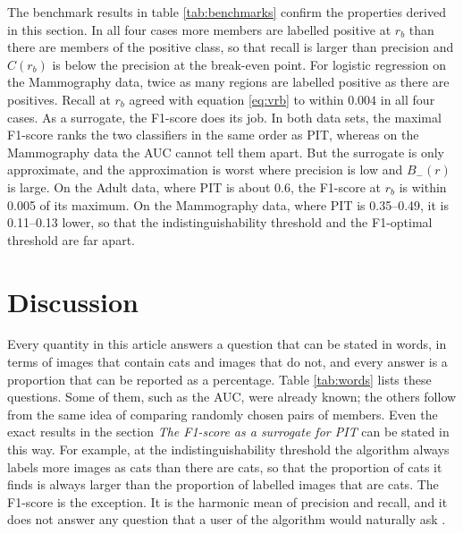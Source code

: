 \documentclass[preprint,12pt]{article}
\begin{document}
The benchmark results in table \ref{tab:benchmarks} confirm the properties derived in this section. In all four cases more members are labelled positive at $r_b$ than there are members of the positive class, so that recall is larger than precision and $C(r_b)$ is below the precision at the break-even point. For logistic regression on the Mammography data, twice as many regions are labelled positive as there are positives. Recall at $r_b$ agreed with equation \ref{eq:vrb} to within $0.004$ in all four cases. As a surrogate, the F1-score does its job. In both data sets, the maximal F1-score ranks the two classifiers in the same order as PIT, whereas on the Mammography data the AUC cannot tell them apart. But the surrogate is only approximate, and the approximation is worst where precision is low and $B_-(r)$ is large. On the Adult data, where PIT is about 0.6, the F1-score at $r_b$ is within 0.005 of its maximum. On the Mammography data, where PIT is 0.35--0.49, it is 0.11--0.13 lower, so that the indistinguishability threshold and the F1-optimal threshold are far apart.

\section*{Discussion}

Every quantity in this article answers a question that can be stated in words, in terms of images that contain cats and images that do not, and every answer is a proportion that can be reported as a percentage. Table \ref{tab:words} lists these questions. Some of them, such as the AUC, were already known; the others follow from the same idea of comparing randomly chosen pairs of members. Even the exact results in the section {\it The F1-score as a surrogate for PIT} can be stated in this way. For example, at the indistinguishability threshold the algorithm always labels more images as cats than there are cats, so that the proportion of cats it finds is always larger than the proportion of labelled images that are cats. The F1-score is the exception. It is the harmonic mean of precision and recall, and it does not answer any question that a user of the algorithm would naturally ask \cite{hand2018note, hand2021f}.
\end{document}
